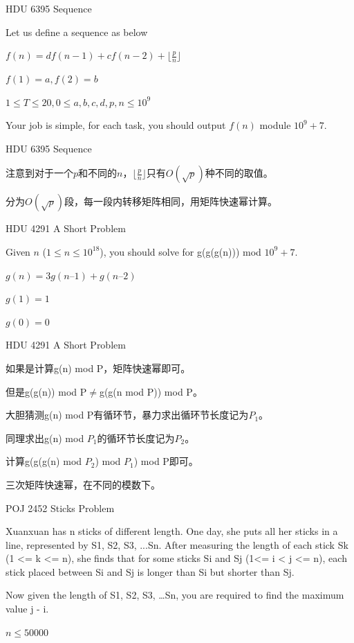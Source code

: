 \documentclass{beamer}
\begin{document}
\begin{frame}{HDU 6395 Sequence}

    Let us define a sequence as below

    $f(n) = d f(n-1) + c f(n-2) + \lfloor\frac{p}{n}\rfloor$

    $f(1)=a, f(2)=b$

    $1 \leq T \leq 20, 0 \leq a, b, c, d, p, n \leq 10^9$

    Your job is simple, for each task, you should output $f(n)$ module $10^9+7$.

\end{frame}

\begin{frame}{HDU 6395 Sequence}

    注意到对于一个$p$和不同的$n$，$\lfloor\frac{p}{n}\rfloor$只有$O(\sqrt{p})$种不同的取值。

    分为$O(\sqrt{p})$段，每一段内转移矩阵相同，用矩阵快速幂计算。
    
\end{frame}

\begin{frame}{HDU 4291 A Short Problem}

    Given $n$ ($1\leq n\leq 10^{18}$),
    you should solve for g(g(g(n))) mod $10^9+7$.

    $g(n) = 3g(n–1) + g(n–2)$
    
    $g(1) = 1$
    
    $g(0) = 0$

\end{frame}

\begin{frame}{HDU 4291 A Short Problem}

    如果是计算g(n) mod P，矩阵快速幂即可。

    但是g(g(n)) mod P$\not =$g(g(n mod P)) mod P。

    大胆猜测g(n) mod P有循环节，暴力求出循环节长度记为$P_1$。

    同理求出g(n) mod $P_1$的循环节长度记为$P_2$。

    计算g(g(g(n) mod $P_2$) mod $P_1$) mod P即可。

    三次矩阵快速幂，在不同的模数下。
    
\end{frame}

\begin{frame}{POJ 2452 Sticks Problem}

    Xuanxuan has n sticks of different length. One day, she puts all her sticks in a line, represented by S1, S2, S3, ...Sn. After measuring the length of each stick Sk (1 <= k <= n), she finds that for some sticks Si and Sj (1<= i < j <= n), each stick placed between Si and Sj is longer than Si but shorter than Sj. 

    Now given the length of S1, S2, S3, …Sn, you are required to find the maximum value j - i.

    $n \leq 50000$

\end{frame}
\end{document}
